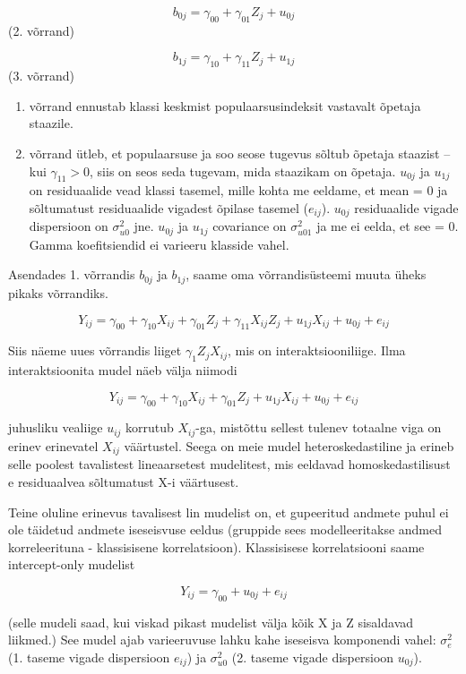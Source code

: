 \documentclass[]{book}
\providecommand{\tightlist}{%
  \setlength{\itemsep}{0pt}\setlength{\parskip}{0pt}}
\begin{document}
\[b_{0j} = \gamma_{00} + \gamma_{01} Z_j + u_{0j}\] (2. võrrand)

\[b_{1j} = \gamma_{10} + \gamma_{11} Z_j + u_{1j}\] (3. võrrand)

\begin{enumerate}
\def\labelenumi{\arabic{enumi}.}
\setcounter{enumi}{1}
\tightlist
\item
  võrrand ennustab klassi keskmist populaarsusindeksit vastavalt õpetaja staazile.
\item
  võrrand ütleb, et populaarsuse ja soo seose tugevus sõltub õpetaja staazist -- kui \(\gamma_{11} > 0\), siis on seos seda tugevam, mida staazikam on õpetaja. \(u_{0j}\) ja \(u_{1j}\) on residuaalide vead klassi tasemel, mille kohta me eeldame, et mean = 0 ja sõltumatust residuaalide vigadest õpilase tasemel (\(e_{ij}\)). \(u_{0j}\) residuaalide vigade dispersioon on \(\sigma^2_{u0}\) jne. \(u_{0j}\) ja \(u_{1j}\) covariance on \(\sigma^2_{u01}\) ja me ei eelda, et see = 0. Gamma koefitsiendid ei varieeru klasside vahel.
\end{enumerate}

Asendades 1. võrrandis \(b_{0j}\) ja \(b_{1j}\), saame oma võrrandisüsteemi muuta üheks pikaks võrrandiks.

\[Y_{ij} = \gamma_{00} + \gamma_{10} X_{ij} + \gamma_{01} Z_j + \gamma_{11}X_{ij} Z_j + u_{1j} X_{ij} + u_{0j} + e_{ij}\]

Siis näeme uues võrrandis liiget \(\gamma_1 Z_j X_{ij}\), mis on interaktsiooniliige.
Ilma interaktsioonita mudel näeb välja niimodi

\[Y_{ij} = \gamma_{00} + \gamma_{10} X_{ij} + \gamma_{01} Z_j + u_{1j} X_{ij} + u_{0j} + e_{ij}\]

juhusliku vealiige \(u_{ij}\) korrutub \(X_{ij}\)-ga, mistõttu sellest tulenev totaalne viga on erinev erinevatel \(X_{ij}\) väärtustel. Seega on meie mudel heteroskedastiline ja erineb selle poolest tavalistest lineaarsetest mudelitest, mis eeldavad homoskedastilisust e residuaalvea sõltumatust X-i väärtusest.

Teine oluline erinevus tavalisest lin mudelist on, et gupeeritud andmete puhul ei ole täidetud andmete iseseisvuse eeldus (gruppide sees modelleeritakse andmed korreleerituna - klassisisene korrelatsioon). Klassisisese korrelatsiooni saame intercept-only mudelist

\[Y_{ij} = \gamma_{00} + u_{0j} + e_{ij}\]

(selle mudeli saad, kui viskad pikast mudelist välja kõik X ja Z sisaldavad liikmed.) See mudel ajab varieeruvuse lahku kahe iseseisva komponendi vahel: \(\sigma^2_e\) (1. taseme vigade dispersioon \(e_{ij}\)) ja \(\sigma^2_{u0}\) (2. taseme vigade dispersioon \(u_{0j}\)).
\end{document}

